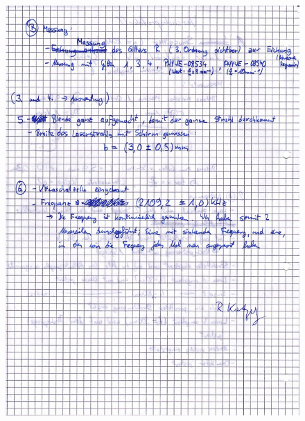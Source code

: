 \begin{appendix}
\begin{figure}[H]
\centering \includegraphics[width=\textwidth]{Bilder/Protokoll2.jpg}
\end{figure}

\end{appendix}